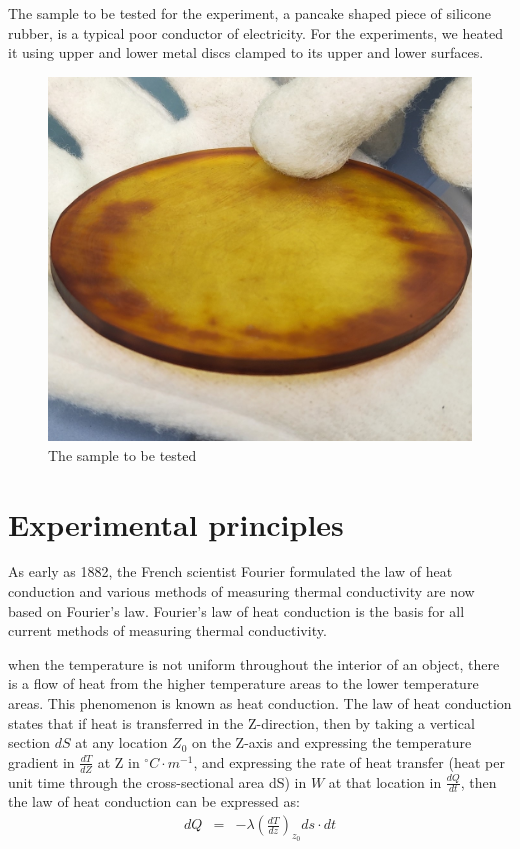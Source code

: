 \documentclass[UTF8]{article}
\begin{document}
       The sample to be tested for the experiment, a pancake shaped piece of silicone rubber, is a typical poor conductor of electricity. For the experiments, we heated it using upper and lower metal discs clamped to its upper and lower surfaces.
       \begin{figure}[H]
      	\centering
      	\includegraphics[clip,scale=0.25,trim={0 210 0 200}]{fig/fig6.jpg}
      	\caption{The sample to be tested}
      	\label{figure.6}
      \end{figure}
      
	\section{Experimental principles}
    As early as 1882, the French scientist Fourier formulated the law of heat conduction and various methods of measuring thermal conductivity are now based on Fourier's law. Fourier's law of heat conduction is the basis for all current methods of measuring thermal conductivity.
    
    when the temperature is not uniform throughout the interior of an object, there is a flow of heat from the higher temperature areas to the lower temperature areas.  This phenomenon is known as heat conduction. The law of heat conduction states that if heat is transferred in the Z-direction, then by taking a vertical section $dS$ at any location $Z_{0} $ on the Z-axis and expressing the temperature gradient in $\frac{dT}{dZ}$ at Z in $^{\circ} C\cdot m^{-1} $, and expressing the rate of heat transfer (heat per unit time through the cross-sectional area dS) in $W$ at that location in $\frac{dQ}{dt} $, then the law of heat conduction can be expressed as:
    \begin{eqnarray}dQ & = & -\lambda \left ( \frac{dT}{dz} \right )_{z_{0} }  ds\cdot dt\end{eqnarray}
    
\end{document}
